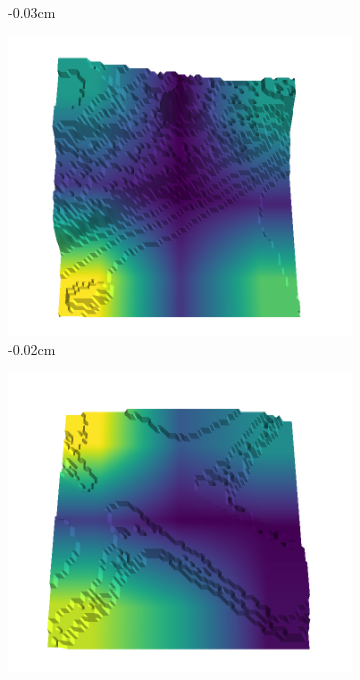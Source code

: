 \documentclass[../document.tex]{subfiles}
\begin{document}
\begin{figure}[H]
\begin{subfigure}[b]{0.242\linewidth}
    \caption{-0.03cm}
    \end{subfigure}
    \begin{subfigure}[b]{0.242\linewidth}
    \includegraphics[width=\linewidth]{../img/5/quarry/worst/02-patch-3d-majavi-colormap-50.png}
    \caption{-0.02cm}
    \end{subfigure}
    \begin{subfigure}[b]{0.242\linewidth}
    \includegraphics[width=\linewidth]{../img/5/quarry/worst/03-patch-3d-majavi-colormap-55.png}

\end{subfigure}
\end{figure}
\end{document}
